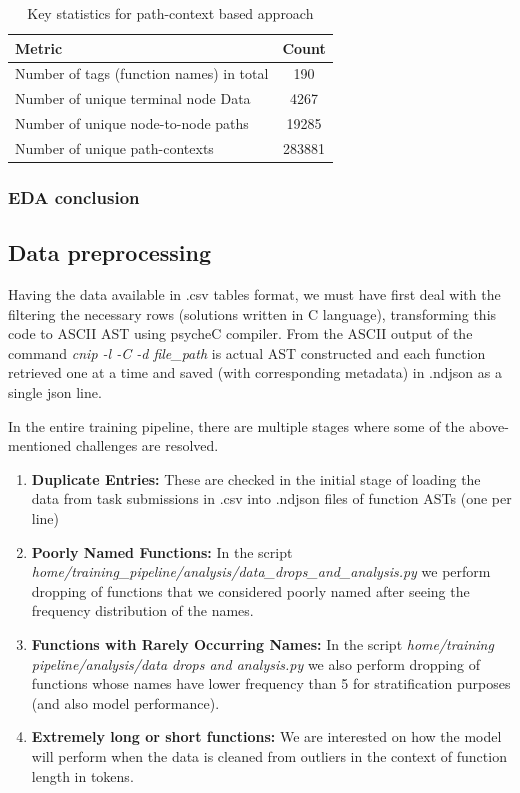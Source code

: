 \documentclass[10pt,english,a4paper]{report}
\begin{document}
\begin{table}[h!]
    \centering
    \caption{Key statistics for path-context based approach}
    \label{tab:function_ast_summary}
    \begin{tabular}{|l|c|}
        \hline
        \textbf{Metric} & \textbf{Count} \\
        \hline
        Number of tags (function names) in total & 190 \\
        \hline
        Number of unique terminal node Data & 4267 \\
        \hline
        Number of unique node-to-node paths & 19285 \\
        \hline
        Number of unique path-contexts & 283881 \\
        \hline
    \end{tabular}
\end{table}

\subsubsection{EDA conclusion}

\subsection{Data preprocessing}
Having the data available in .csv tables format, we must have first deal with the filtering the necessary rows (solutions written in C language), transforming this code to ASCII AST using psycheC compiler. From the ASCII output of the command \textit{cnip -l -C -d file\_path} is actual
AST constructed and each function retrieved one at a time and saved (with corresponding metadata) in .ndjson as a single json line.

In the entire training pipeline, there are multiple stages where some of the above-mentioned challenges are resolved.

\begin{enumerate}
    \item \textbf{Duplicate Entries:} These are checked in the initial  stage of loading the data from task submissions in .csv into .ndjson files of function ASTs (one per line)
    \item \textbf{Poorly Named Functions:} In the script \textit{home/training\_pipeline/analysis/data\_drops\_and\_analysis.py} we perform dropping of functions that we considered poorly named after seeing the frequency distribution of the names.
    \item \textbf{Functions with Rarely Occurring Names:}  In the script \textit{home/training pipeline/analysis/data drops and analysis.py} we also perform dropping of functions whose names have lower frequency than 5 for stratification purposes (and also model performance).
    \item \textbf{Extremely long or short functions:} We are interested on how the model will
    perform when the data is cleaned from outliers in the context of function length in tokens.
\end{enumerate}
\end{document}
